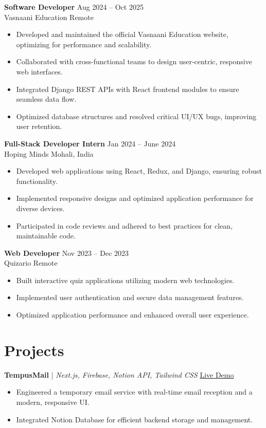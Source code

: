 \documentclass[a4paper,10pt]{article}
\begin{document}
\textbf{Software Developer} \hfill Aug 2024 -- Oct 2025 \\
Vasnaani Education \hfill Remote
\begin{itemize}[leftmargin=0.15in, label={-}]
    \item Developed and maintained the official Vasnaani Education website, optimizing for performance and scalability.
    \item Collaborated with cross-functional teams to design user-centric, responsive web interfaces.
    \item Integrated Django REST APIs with React frontend modules to ensure seamless data flow.
    \item Optimized database structures and resolved critical UI/UX bugs, improving user retention.
\end{itemize}

\textbf{Full-Stack Developer Intern} \hfill Jan 2024 -- June 2024 \\
Hoping Minds \hfill Mohali, India
\begin{itemize}[leftmargin=0.15in, label={-}]
    \item Developed web applications using React, Redux, and Django, ensuring robust functionality.
    \item Implemented responsive designs and optimized application performance for diverse devices.
    \item Participated in code reviews and adhered to best practices for clean, maintainable code.
\end{itemize}

\textbf{Web Developer} \hfill Nov 2023 -- Dec 2023 \\
Quizario \hfill Remote
\begin{itemize}[leftmargin=0.15in, label={-}]
    \item Built interactive quiz applications utilizing modern web technologies.
    \item Implemented user authentication and secure data management features.
    \item Optimized application performance and enhanced overall user experience.
\end{itemize}

\section{Projects}

\textbf{TempusMail} | \textit{Next.js, Firebase, Notion API, Tailwind CSS} \hfill \href{https://tempusmail-backend--tempusmail6827.us-central1.hosted.app/}{Live Demo}
\begin{itemize}[leftmargin=0.15in, label={-}]
    \item Engineered a temporary email service with real-time email reception and a modern, responsive UI.
    \item Integrated Notion Database for efficient backend storage and management.
\end{itemize}
\end{document}
